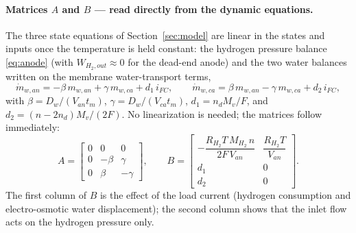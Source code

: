 \documentclass[11pt,a4paper]{article}
\begin{document}
\paragraph{Matrices $A$ and $B$ --- read directly from the dynamic equations.}
The three state equations of Section~\ref{sec:model} are linear in the states and
inputs once the temperature is held constant: the hydrogen pressure balance
\eqref{eq:anode} (with $W_{H_2,out}\approx 0$ for the dead-end anode) and the two
water balances written on the membrane water-transport terms,
\begin{equation*}
    \dot{m}_{w,an} = -\beta\, m_{w,an} + \gamma\, m_{w,ca} + d_1\, i_{FC},
    \qquad
    \dot{m}_{w,ca} = \beta\, m_{w,an} - \gamma\, m_{w,ca} + d_2\, i_{FC},
\end{equation*}
with
$\beta = D_w/(V_{an}t_m)$, $\gamma = D_w/(V_{ca}t_m)$,
$d_1 = n_d M_v/F$, and $d_2 = (n-2n_d)M_v/(2F)$.
No linearization is needed; the matrices follow immediately:
\begin{equation}
    A =
    \begin{bmatrix}
        0 & 0 & 0\\[2pt]
        0 & -\beta & \gamma\\[2pt]
        0 & \beta & -\gamma
    \end{bmatrix},
    \qquad
    B =
    \begin{bmatrix}
        -\dfrac{R_{H_2}T\,M_{H_2}\,n}{2F\,V_{an}} & \dfrac{R_{H_2}T}{V_{an}}\\[8pt]
        d_1 & 0\\[2pt]
        d_2 & 0
    \end{bmatrix}.
    \label{eq:AB}
\end{equation}
The first column of $B$ is the effect of the load current (hydrogen consumption
and electro-osmotic water displacement); the second column shows that the inlet
flow acts on the hydrogen pressure only.
\end{document}
